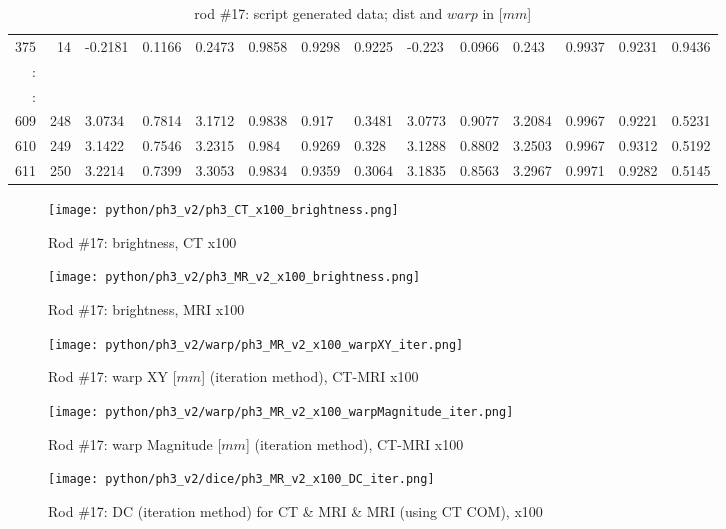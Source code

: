 \begin{table}[p]
{\begin{minipage}{\textheight}
\begin{tabular}{rr||lll|lll||lll|lll}
375    & 14   & -0.2181 & 0.1166  & 0.2473 & 0.9858 & 0.9298 & 0.9225 & -0.223  & 0.0966  & 0.243  & 0.9937 & 0.9231 & 0.9436 \\
:      &      &         &         &        &        &        &        &         &         &        &        &        &        \\
\hline
:      &      &         &         &        &        &        &        &         &         &        &        &        &        \\
609    & 248  & 3.0734  & 0.7814  & 3.1712 & 0.9838 & 0.917  & 0.3481 & 3.0773  & 0.9077  & 3.2084 & 0.9967 & 0.9221 & 0.5231 \\
610    & 249  & 3.1422  & 0.7546  & 3.2315 & 0.984  & 0.9269 & 0.328  & 3.1288  & 0.8802  & 3.2503 & 0.9967 & 0.9312 & 0.5192 \\
611    & 250  & 3.2214  & 0.7399  & 3.3053 & 0.9834 & 0.9359 & 0.3064 & 3.1835  & 0.8563  & 3.2967 & 0.9971 & 0.9282 & 0.5145
\end{tabular}
       \caption{rod \#17: script generated data; dist and $warp$ in [$mm$]}
       \label{tab:spit-out-17}
     \end{minipage}
   }
 \end{table}

\begin{figure}[!thb]
    \centering
    \texttt{[image: python/ph3\_v2/ph3\_CT\_x100\_brightness.png]}
    \caption{Rod \#17: brightness, CT x100}
    \label{fig:ph3_CT_x100_brightness}
\end{figure}

\begin{figure}[!tbh]
    \centering
    \texttt{[image: python/ph3\_v2/ph3\_MR\_v2\_x100\_brightness.png]}
    \caption{Rod \#17: brightness, MRI x100}
    \label{fig:ph3_MR_x100_brightness}
\end{figure}


\begin{figure}[!hbt]
  \centering
  \texttt{[image: python/ph3\_v2/warp/ph3\_MR\_v2\_x100\_warpXY\_iter.png]}
  \caption{Rod \#17: warp XY [$mm$] (iteration method), CT-MRI x100}
  \label{fig:ph3_warpXY_x100}
\end{figure}

\begin{figure}[!htb]
    \centering
    \texttt{[image: python/ph3\_v2/warp/ph3\_MR\_v2\_x100\_warpMagnitude\_iter.png]}
    \caption{Rod \#17: warp Magnitude [$mm$] (iteration method), CT-MRI x100}
    \label{fig:ph3_warpMagnitude_x100}
\end{figure}

\begin{figure}[!htb]
     \centering
     \texttt{[image: python/ph3\_v2/dice/ph3\_MR\_v2\_x100\_DC\_iter.png]}
     \caption{Rod \#17: DC (iteration method) for CT \& MRI \& MRI (using CT COM), x100}
     \label{fig:ph3_DC_x100}
\end{figure}



\cleardoublepage